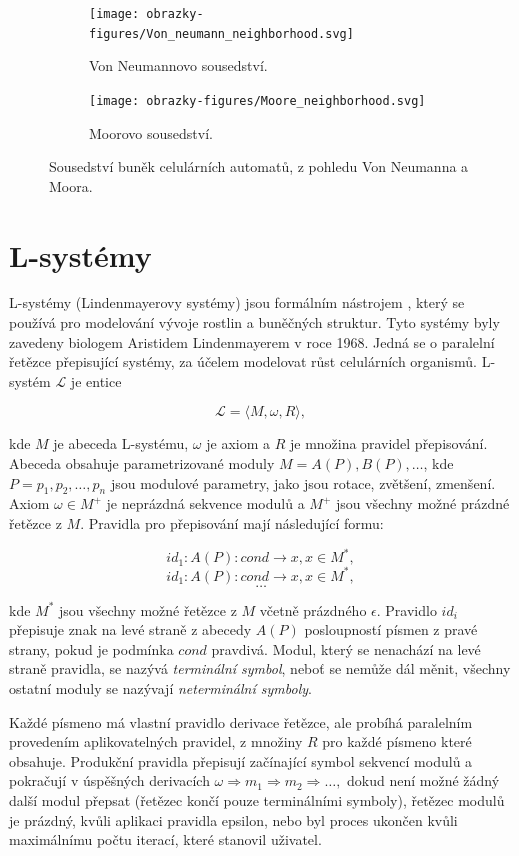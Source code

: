 \begin{figure}[h]
	\centering
	\begin{subfigure}{0.475\textwidth}
		\centering
		\texttt{[image: obrazky-figures/Von\_neumann\_neighborhood.svg]}
		\caption{Von Neumannovo sousedství.}
		\label{vonNeumann}
	\end{subfigure}
	\begin{subfigure}{0.475\textwidth}
		\centering
		\texttt{[image: obrazky-figures/Moore\_neighborhood.svg]}
		\caption{Moorovo sousedství.}
		\label{moore}
	\end{subfigure}
	\caption{Sousedství buněk celulárních automatů, z pohledu Von Neumanna a Moora.}
\end{figure}

\section{L-systémy}
\label{lsystems}
L-systémy (Lindenmayerovy systémy) jsou formálním nástrojem \cite{prusinkiewicz1986graphical}, který se používá pro modelování vývoje rostlin a buněčných struktur. Tyto systémy byly zavedeny biologem Aristidem Lindenmayerem v roce 1968. \cite{inverseL-systems} Jedná se o paralelní řetězce přepisující systémy, za účelem modelovat růst celulárních organismů. L-systém $\mathcal{L}$ je entice

\[\mathcal{L} = \langle M,\omega,R\rangle ,\]


kde $M$ je abeceda L-systému, $\omega$ je axiom a $R$ je množina pravidel přepisování. Abeceda obsahuje parametrizované moduly $M = {A(P),B(P),\ldots}$, kde $P=p_1,p_2,\ldots,p_n$ jsou modulové parametry, jako jsou rotace, zvětšení, zmenšení.
Axiom $\omega \in M^+$ je neprázdná sekvence modulů a $M^+$ jsou všechny možné prázdné řetězce z $M$. Pravidla pro přepisování mají následující formu:

\[id_1:A(P):cond\rightarrow x,x \in M^*,\]
\[id_1:A(P):cond\rightarrow x,x \in M^*,\]
\[\ldots\]

kde $M^*$ jsou všechny možné řetězce z $M$ včetně prázdného $\epsilon$. Pravidlo $id_i$ přepisuje znak na levé straně z abecedy $A(P)$ posloupností písmen z pravé strany, pokud je podmínka $cond$ pravdivá. Modul, který se nenachází na levé straně pravidla, se nazývá \textit{terminální symbol}, neboť se nemůže dál měnit, všechny ostatní moduly se nazývají \textit{neterminální symboly}.\cite{prusinkiewicz2012algorithmic}

Každé písmeno má vlastní pravidlo derivace řetězce, ale probíhá paralelním provedením aplikovatelných pravidel, z množiny $R$ pro každé písmeno které obsahuje. Produkční pravidla přepisují začínající symbol sekvencí modulů a pokračují v úspěšných derivacích $\omega \Rightarrow m_1 \Rightarrow m_2 \Rightarrow \ldots,$ dokud není možné žádný další modul přepsat (řetězec končí pouze terminálními symboly), řetězec modulů je prázdný, kvůli aplikaci pravidla epsilon, nebo byl proces ukončen kvůli maximálnímu počtu iterací, které stanovil uživatel.\cite{lindenmayer1968mathematical}

